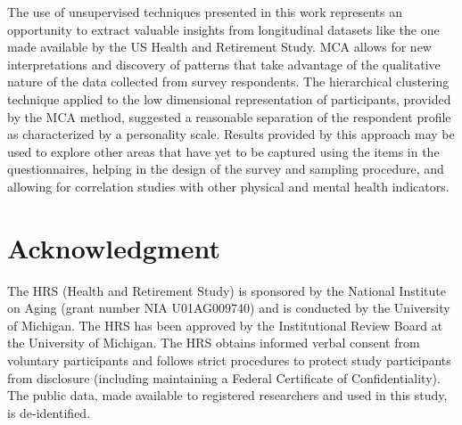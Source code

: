 \documentclass[conference,final,]{IEEEtran}
\begin{document}
The use of unsupervised techniques presented in this work represents an
opportunity to extract valuable insights from longitudinal datasets like
the one made available by the US Health and Retirement Study. MCA allows
for new interpretations and discovery of patterns that take advantage of
the qualitative nature of the data collected from survey respondents.
The hierarchical clustering technique applied to the low dimensional
representation of participants, provided by the MCA method, suggested a
reasonable separation of the respondent profile as characterized by a
personality scale. Results provided by this approach may be used to
explore other areas that have yet to be captured using the items in the
questionnaires, helping in the design of the survey and sampling
procedure, and allowing for correlation studies with other physical and
mental health indicators.

\hypertarget{acknowledgment}{%
\section{Acknowledgment}\label{acknowledgment}}

The HRS (Health and Retirement Study) is sponsored by the National
Institute on Aging (grant number NIA U01AG009740) and is conducted by
the University of Michigan. The HRS has been approved by the
Institutional Review Board at the University of Michigan. The HRS
obtains informed verbal consent from voluntary participants and follows
strict procedures to protect study participants from disclosure
(including maintaining a Federal Certificate of Confidentiality). The
public data, made available to registered researchers and used in this
study, is de-identified.




\end{document}

